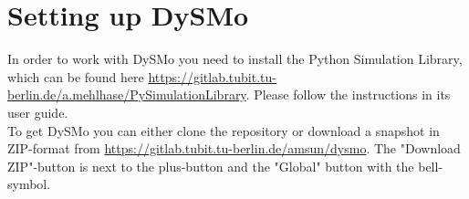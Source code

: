 \section{Setting up DySMo}

In order to work with DySMo you need to install the Python Simulation Library, which can be found here \url{https://gitlab.tubit.tu-berlin.de/a.mehlhase/PySimulationLibrary}.
Please follow the instructions in its user guide.
\\
To get DySMo you can either clone the repository or download a snapshot in ZIP-format from \url{https://gitlab.tubit.tu-berlin.de/amsun/dysmo}.
The "Download ZIP"-button is next to the plus-button and the "Global" button with the bell-symbol.